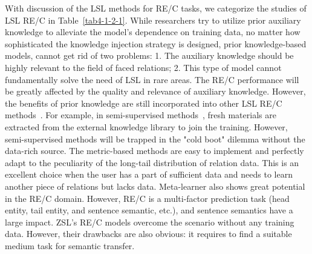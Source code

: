 With discussion of the LSL methods for RE/C tasks, we categorize the studies of LSL RE/C in Table~\ref{tab4-1-2-1}. While researchers try to utilize prior auxiliary knowledge to alleviate the model's dependence on training data, no matter how sophisticated the knowledge injection strategy is designed, prior knowledge-based models, cannot get rid of two problems: 1. The auxiliary knowledge should be highly relevant to the field of faced relations; 2. This type of model cannot fundamentally solve the need of LSL in rare areas. The RE/C performance will be greatly affected by the quality and relevance of auxiliary knowledge. However, the benefits of prior knowledge are still incorporated into other LSL RE/C methods~. For example, in semi-supervised methods~, fresh materials are extracted from the external knowledge library to join the training. However, semi-supervised methods will be trapped in the "cold boot" dilemma without the data-rich source.
The metric-based methods are easy to implement and perfectly adapt to the peculiarity of the long-tail distribution of relation data. This is an excellent choice when the user has a part of sufficient data and needs to learn another piece of relations  but lacks data.  Meta-learner also shows great potential in the RE/C domain. However, RE/C is a multi-factor prediction task (head entity, tail entity, and sentence semantic, etc.), and sentence semantics have a large impact. 
ZSL's RE/C models overcome the scenario without any training data. However, their drawbacks are also obvious: it requires to find a suitable medium task for semantic transfer.

